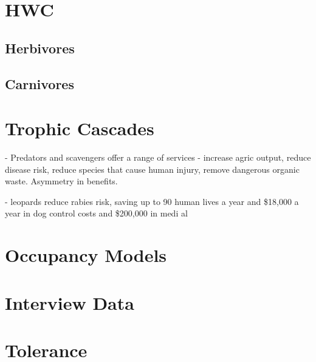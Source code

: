 \section{HWC}

\subsection{Herbivores}

\subsection{Carnivores}

\section{Trophic Cascades}

\cite{O_Bryan_2018} - Predators and scavengers offer a range of services - increase agric output, reduce disease risk, reduce species that cause human injury, remove dangerous organic waste. Asymmetry in benefits.

\cite{Braczkowski_2018} - leopards reduce rabies risk, saving up to 90 human lives a year and \$18,000 a year in dog control costs and \$200,000 in medi al

\section{Occupancy Models}

\section{Interview Data}

\section{Tolerance}
